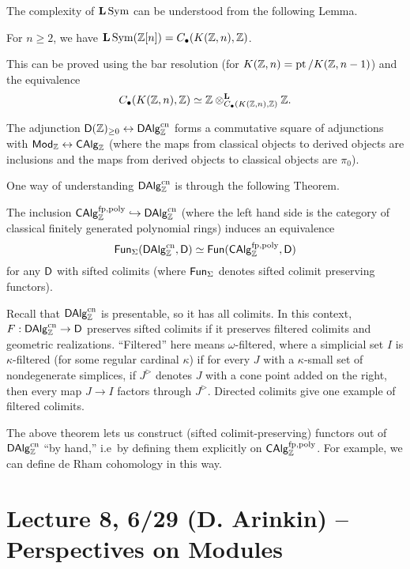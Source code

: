 \documentclass{amsart}
\begin{document}
The complexity of $\mathbf{L} \operatorname{Sym}$ can be understood from the following Lemma.

\begin{lem}
	For $n \geq 2$, we have $\mathbf{L} \operatorname{Sym} (\mathbb{Z}[n]) = C_\bullet(K(\mathbb{Z}, n), \mathbb{Z})$.
\end{lem}

This can be proved using the bar resolution (for $K(\mathbb{Z}, n) = \operatorname{pt} / K(\mathbb{Z}, n-1)$) and the equivalence
\[
	C_\bullet(K(\mathbb{Z}, n), \mathbb{Z}) \simeq \mathbb{Z} \otimes_{C_\bullet(K(\mathbb{Z}, n), \mathbb{Z})}^{\mathbf{L}} \mathbb{Z}.
\]

The adjunction $\mathsf{D}(\mathbb{Z})_{\geq 0} \leftrightarrow \mathsf{DAlg}_{\mathbb{Z}}^{\mathrm{cn}}$ forms a commutative square of adjunctions with $\mathsf{Mod}_{\mathbb{Z}} \leftrightarrow \mathsf{CAlg}_{\mathbb{Z}}$ (where the maps from classical objects to derived objects are inclusions and the maps from derived objects to classical objects are $\pi_0$).

One way of understanding $\mathsf{DAlg}_{\mathbb{Z}}^{\mathrm{cn}}$ is through the following Theorem.

\begin{thm}
	The inclusion $\mathsf{CAlg}_{\mathbb{Z}}^{\mathrm{fp,poly}} \hookrightarrow \mathsf{DAlg}_{\mathbb{Z}}^{\mathrm{cn}}$ (where the left hand side is the category of classical finitely generated polynomial rings) induces an equivalence
	\[
		\mathsf{Fun}_\Sigma(\mathsf{DAlg}_{\mathbb{Z}}^{\mathrm{cn}}, \mathsf{D}) \simeq \mathsf{Fun}(\mathsf{CAlg}_{\mathbb{Z}}^{\mathrm{fp,poly}}, \mathsf{D})
	\]
	for any $\mathsf{D}$ with sifted colimits (where $\mathsf{Fun}_\Sigma$ denotes sifted colimit preserving functors).
\end{thm}

Recall that $\mathsf{DAlg}_{\mathbb{Z}}^{\mathrm{cn}}$ is presentable, so it has all colimits.
In this context, $F: \mathsf{DAlg}_{\mathbb{Z}}^{\mathrm{cn}} \to \mathsf{D}$ preserves sifted colimits if it preserves filtered colimits and geometric realizations.
``Filtered'' here means $\omega$-filtered, where a simplicial set $I$ is $\kappa$-filtered (for some regular cardinal $\kappa$) if for every $J$ with a $\kappa$-small set of nondegenerate simplices, if $J^\triangleright$ denotes $J$ with a cone point added on the right, then every map $J \to I$ factors through $J^\triangleright$.
Directed colimits give one example of filtered colimits.

The above theorem lets us construct (sifted colimit-preserving) functors out of $\mathsf{DAlg}_{\mathbb{Z}}^{\mathrm{cn}}$ ``by hand,'' i.e\ by defining them explicitly on $\mathsf{CAlg}_{\mathbb{Z}}^{\mathrm{fp,poly}}$.
For example, we can define de Rham cohomology in this way.

\section{Lecture 8, 6/29 (D. Arinkin) -- Perspectives on Modules}
\end{document}
